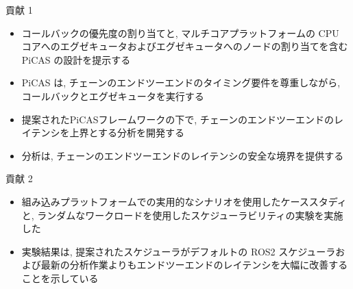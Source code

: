 \begin{frame}{貢献 1}
    \begin{itemize}
        \item  コールバックの優先度の割り当てと, マルチコアプラットフォームの CPU コアへのエグゼキュータおよびエグゼキュータへのノードの割り当てを含む PiCAS の設計を提示する
        \item PiCAS は, チェーンのエンドツーエンドのタイミング要件を尊重しながら, コールバックとエグゼキュータを実行する
        \item  提案されたPiCASフレームワークの下で, チェーンのエンドツーエンドのレイテンシを上界とする分析を開発する
        \item 分析は, チェーンのエンドツーエンドのレイテンシの安全な境界を提供する
    \end{itemize}
\end{frame}

\begin{frame}{貢献 2}
    \begin{itemize}
        \item 組み込みプラットフォームでの実用的なシナリオを使用したケーススタディと, ランダムなワークロードを使用したスケジューラビリティの実験を実施した
        \item 実験結果は, 提案されたスケジューラがデフォルトの ROS2 スケジューラおよび最新の分析作業よりもエンドツーエンドのレイテンシを大幅に改善することを示している
    \end{itemize}
\end{frame}
